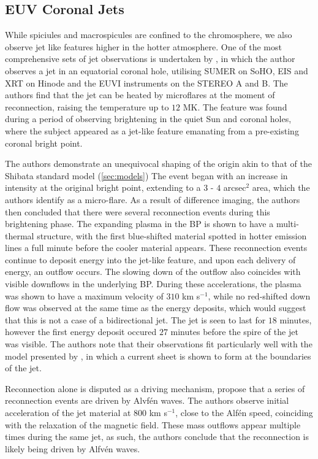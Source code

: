 \subsection{EUV Coronal Jets}
While spiciules and macrospicules are confined to the chromosphere, we also observe jet like features higher in the hotter atmosphere.
One of the most comprehensive sets of jet observations is undertaken by \cite{Majarska2011}, in which the author observes a jet in an equatorial coronal hole, utilising SUMER on SoHO, EIS and XRT on Hinode and the EUVI instruments on the STEREO A and B.
The authors find that the jet can be heated by microflares at the moment of reconnection, raising the temperature up to $12$ MK.
The feature was found during a period of observing brightening in the quiet Sun and coronal holes, where the subject appeared as a jet-like feature emanating from a pre-existing coronal bright point.

The authors demonstrate an unequivocal shaping of the origin akin to that of the Shibata standard model (\ref{sec:models})
The event began with an increase in intensity at the original bright point, extending to a $3$ - $4$ arcsec$^2$ area, which the authors identify as a micro-flare.
As a result of difference imaging, the authors then concluded that there were several reconnection events during this brightening phase.
The expanding plasma in the BP is shown to have a multi-thermal structure, with the first blue-shifted material spotted in hotter emission lines a full minute before the cooler material appears.
These reconnection events continue to deposit energy into the jet-like feature, and upon each delivery of energy, an outflow occurs.
The slowing down of the outflow also coincides with visible downflows in the underlying BP.
During these accelerations, the plasma was shown to have a maximum velocity of $310$ km s$^{-1}$, while no red-shifted down flow was observed at the same time as the energy deposits, which would suggest that this is not a case of a bidirectional jet.
The jet is seen to last for $18$ minutes, however the first energy deposit occured $27$ minutes before the spire of the jet was visible.
The authors note that their observations fit particularly well with the model presented by \cite{Moreno2008}, in which a current sheet is shown to form at the boundaries of the jet.

Reconnection alone is disputed as a driving mechanism, \cite{Cirtain2007} propose that a series of reconnection events are driven by Alvf{\'e}n waves.
The authors observe initial acceleration of the jet material at $800$ km s$^{-1}$, close to the Alf{\'e}n speed, coinciding with the relaxation of the magnetic field.
These mass outflows appear multiple times during the same jet, as such, the authors conclude that the reconnection is likely being driven by Alfv{\'e}n waves.


